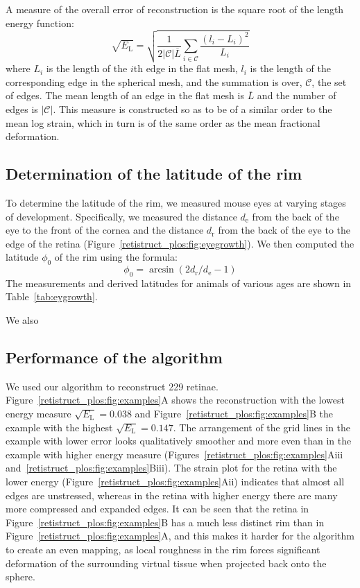 \documentclass[10pt]{article}
\begin{document}
A measure of the overall error of reconstruction is the square root
of the length energy function:
\begin{equation} 
  \sqrt{E_\mathrm{L}} = \sqrt{\frac{1}{2|\mathcal{C}|\overline{L}}
  \sum_{i\in\mathcal{C}} \frac{(l_i - L_i)^2}{L_i}}
\end{equation} 
where $L_i$ is the length of the $i$th edge in the flat mesh, $l_i$ is
the length of the corresponding edge in the spherical mesh, and the
summation is over, $\mathcal{C}$, the set of edges. The mean length of
an edge in the flat mesh is $\overline{L}$ and the number of edges is
$|\mathcal{C}|$. This measure is constructed so as to be of a similar
order to the mean log strain, which in turn is of the same order as
the mean fractional deformation.  

\subsection*{Determination of the latitude of the rim}
\label{retistruct_plos:sec:determ-latt-rim}

To determine the latitude of the rim, we measured mouse eyes at
varying stages of development. Specifically, we measured the distance
$d_\mathrm{e}$ from the back of the eye to the front of the cornea and
the distance $d_\mathrm{r}$ from the back of the eye to the edge of
the retina (Figure~\ref{retistruct_plos:fig:eyegrowth}). We then
computed the latitude $\phi_0$ of the rim using the formula:
\begin{equation}
  \label{retistruct_plos:eq:4}
  \phi_0 = \arcsin (2d_\mathrm{r}/d_\mathrm{e}-1)
\end{equation}
The measurements and derived latitudes for animals of various ages
are shown in Table~\ref{tab:eygrowth}.

We also 

\subsection*{Performance of the algorithm}
\label{retistruct_plos:sec:perf-algor}

We used our algorithm to reconstruct 229 retinae. 
Figure~\ref{retistruct_plos:fig:examples}A shows the reconstruction
with the lowest energy measure $\sqrt{E_\mathrm{L}}=0.038$ and
Figure~\ref{retistruct_plos:fig:examples}B the example with the
highest $\sqrt{E_\mathrm{L}}=0.147$. The arrangement of the grid lines
in the example with lower error looks qualitatively smoother and more
even than in the example with higher energy measure
(Figures~\ref{retistruct_plos:fig:examples}Aiii
and~\ref{retistruct_plos:fig:examples}Biii). The strain plot for the
retina with the lower energy
(Figure~\ref{retistruct_plos:fig:examples}Aii) indicates that almost
all edges are unstressed, whereas in the retina with higher energy
there are many more compressed and expanded edges. It can be seen that
the retina in Figure~\ref{retistruct_plos:fig:examples}B has a much
less distinct rim than in Figure~\ref{retistruct_plos:fig:examples}A,
and this makes it harder for the algorithm to create an even mapping,
as local roughness in the rim forces significant deformation of the
surrounding virtual tissue when projected back onto the sphere.
\end{document}
